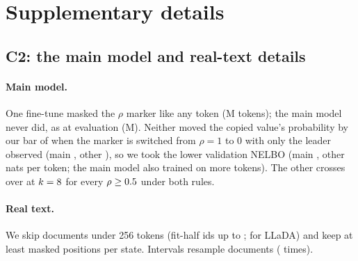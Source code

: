 \section{Supplementary details}
\label{sec:app}



\subsection{C2: the main model and real-text details}
\label{sec:c2-app}

\paragraph{Main model.}
One fine-tune masked the $\rho$ marker like any token (\CTwoAltFtTokensM{}M tokens); the main
model never did, as at evaluation (\CTwoFtTokensM{}M). Neither moved the copied value's
probability by our bar of \CTwoMarkerBar{} when the marker is switched from $\rho=1$ to $0$
with only the leader observed (main \CTwoMarkerEffect, other \CTwoAltMarkerEffect), so we took the
lower validation NELBO (main \CTwoValNelbo, other \CTwoAltValNelbo{} nats per token; the main
model also trained on more tokens). The other crosses over at
$k=8$ for every
$\rho\ge0.5$ under both rules.

\paragraph{Real text.}
We skip documents under 256 tokens (fit-half ids up to
\CTwoTTenLastDocId; \CTwoTTenLladaLastDocId{} for LLaDA) and keep at least \CTwoTTenMinMasked{}
masked positions per state. Intervals resample documents (\CTwoTTenNBoot{} times).




